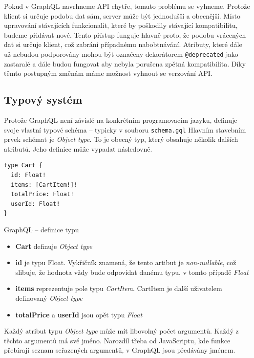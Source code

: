 \documentclass[thesis=M,czech]{FITthesis}[2019/12/23]
\begin{document}
Pokud v GraphQL navrhneme API chytře, tomuto problému se vyhneme. Protože klient si určuje podobu dat sám, server může být jednodušší a obecnější. Místo upravování stávajících funkcionalit, které by poškodily stávající kompatibilitu, budeme přidávat nové. Tento přístup funguje hlavně proto, že podobu vrácených dat si určuje klient, což zabrání případnému nabobtnávání. Atributy, které dále už nebudou podporovány mohou být označeny dekorátorem \texttt{@deprecated} jako zastaralé a dále budou fungovat aby nebyla porušena zpětná kompatibilita. Díky těmto postupným změnám máme možnost vyhnout se verzování API.

\subsection{Typový systém}
Protože GraphQL není závislé na konkrétním programovacím jazyku, definuje svoje vlastní typové schéma -- typicky v souboru \texttt{schema.gql}
Hlavním stavebním prvek schémat je \textit{Object type}. To je obecný typ, který obsahuje několik dalších atributů. Jeho definice může vypadat následovně. 

\begin{listing}[H]
\begin{verbatim}
type Cart {
  id: Float!
  items: [CartItem!]!
  totalPrice: Float!
  userId: Float!
}
\end{verbatim}
\caption{GraphQL -- definice typu}
\label{lst:graphql_type}
\end{listing}

\begin{itemize}
    \item \textbf{Cart} definuje \textit{Object type}
    \item \textbf{id} je typu Float. Vykřičník znamená, že tento artibut je \textit{non-nullable}, což slibuje, že hodnota vždy bude odpovídat danému typu, v tomto případě \textit{Float}
    \item \textbf{items} reprezentuje pole typu \textit{CartItem}. CartItem je další uživatelem definovaný \textit{Object type}
    \item \textbf{totalPrice} a \textbf{userId} jsou opět typu \textit{Float}
\end{itemize}

Každý atribut typu \textit{Object type} může mít libovolný počet argumentů. Každý z těchto argumentů má své jméno. Narozdíl třeba od JavaScriptu, kde funkce přebírají seznam seřazených argumentů, v GraphQL jsou předávány jménem.
\end{document}
